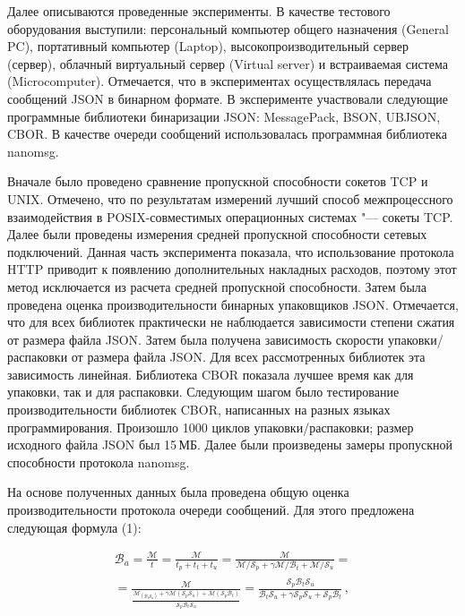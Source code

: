 Далее описываются проведенные эксперименты. В качестве тестового оборудования выступили: персональный компьютер общего назначения (General PC), портативный компьютер (Laptop), высокопроизводительный сервер (сервер), облачный виртуальный сервер (Virtual server) и встраиваемая система (Microcomputer). Отмечается, что в экспериментах осуществлялась передача сообщений JSON в бинарном формате. В эксперименте участвовали следующие программные библиотеки бинаризации JSON: MessagePack, BSON, UBJSON, CBOR. В качестве очереди сообщений использовалась программная библиотека nanomsg.

Вначале было проведено сравнение пропускной способности сокетов TCP и UNIX. Отмечено, что по результатам измерений лучший способ межпроцессного взаимодействия в POSIX-совместимых операционных системах "--- сокеты TCP. Далее были проведены измерения средней пропускной способности сетевых подключений. Данная часть эксперимента показала, что использование протокола HTTP приводит к появлению дополнительных накладных расходов, поэтому этот метод исключается из расчета средней пропускной способности. Затем была проведена оценка производительности бинарных упаковщиков JSON. Отмечается, что для всех библиотек практически не наблюдается зависимости степени сжатия от размера файла JSON. Затем была получена зависимость скорости упаковки/распаковки от размера файла JSON. Для всех рассмотренных библиотек эта зависимость линейная. Библиотека CBOR показала лучшее время как для упаковки, так и для распаковки.
Следующим шагом было тестирование производительности библиотек CBOR, написанных на разных языках программирования. Произошло 1000 циклов упаковки/распаковки; размер исходного файла JSON был 15\,МБ. Далее были произведены замеры пропускной способности протокола nanomsg. 

На основе полученных данных была проведена общую оценка производительности протокола очереди сообщений. Для этого предложена следующая формула (1): 

\begin{equation}
\begin{split}
\label{eq:example}
\mathcal{B}_a = \frac{\mathcal{M}}{t}
= \frac{\mathcal{M}}{t_p + t_t + t_u}
= \frac{\mathcal{M}}
{\mathcal{M} / \mathcal{S}_p + 
	\gamma\mathcal{M} / \mathcal{B}_t + 
	\mathcal{M} / \mathcal{S}_u} = \\
= \frac{\mathcal{M}}
{\frac{\mathcal{M}_(\mathcal{B}_t\mathcal{S}_u) +
		\gamma
		\mathcal{M}(\mathcal{S}_p\mathcal{S}_u) +
		\mathcal{M}(\mathcal{S}_p\mathcal{B}_t)} 
	{\mathcal{S}_p\mathcal{B}_t\mathcal{S}_u}
}
=\frac{\mathcal{S}_p\mathcal{B}_t\mathcal{S}_u}
{\mathcal{B}_t\mathcal{S}_u + \gamma\mathcal{S}_p\mathcal{S}_u + \mathcal{S}_p\mathcal{B}_t}\,,
\end{split}
\end{equation}


